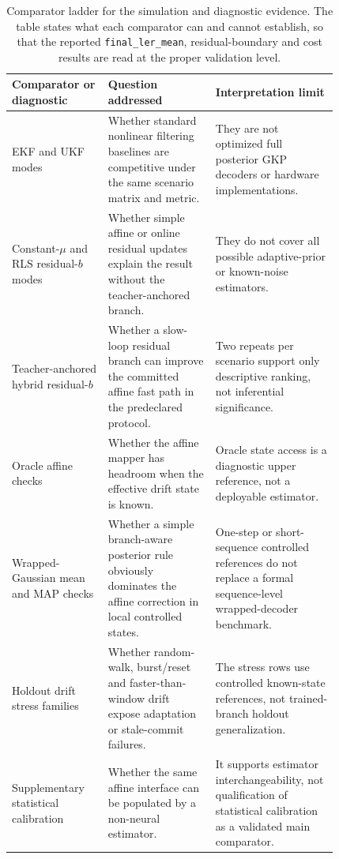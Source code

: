 \documentclass[11pt]{article}
\newcommand{\finalLER}{\texttt{final\_ler\_mean}}
\begin{document}
\begin{table}[htbp]
\centering
\small
\begin{tabular}{@{}>{\raggedright\arraybackslash}p{0.22\linewidth}>{\raggedright\arraybackslash}p{0.28\linewidth}>{\raggedright\arraybackslash}p{0.32\linewidth}@{}}
\toprule
Comparator or diagnostic & Question addressed & Interpretation limit \\
\midrule
EKF and UKF modes & Whether standard nonlinear filtering baselines are
competitive under the same scenario matrix and metric. & They are not
optimized full posterior GKP decoders or hardware implementations. \\
\addlinespace
Constant-\(\mu\) and RLS residual-\(b\) modes & Whether simple affine or
online residual updates explain the result without the teacher-anchored
branch. & They do not cover all possible adaptive-prior or known-noise
estimators. \\
\addlinespace
Teacher-anchored hybrid residual-\(b\) & Whether a slow-loop residual branch
can improve the committed affine fast path in the predeclared protocol. &
Two repeats per scenario support only descriptive ranking, not inferential
significance. \\
\addlinespace
Oracle affine checks & Whether the affine mapper has headroom when the
effective drift state is known. & Oracle state access is a diagnostic upper
reference, not a deployable estimator. \\
\addlinespace
Wrapped-Gaussian mean and MAP checks & Whether a simple branch-aware
posterior rule obviously dominates the affine correction in local controlled
states. & One-step or short-sequence controlled references do not replace a
formal sequence-level wrapped-decoder benchmark. \\
\addlinespace
Holdout drift stress families & Whether random-walk, burst/reset and
faster-than-window drift expose adaptation or stale-commit failures. & The
stress rows use controlled known-state references, not trained-branch holdout
generalization. \\
\addlinespace
Supplementary statistical calibration & Whether the same affine interface can
be populated by a non-neural estimator. & It supports estimator
interchangeability, not qualification of statistical calibration as a validated main
comparator. \\
\bottomrule
\end{tabular}
\caption{Comparator ladder for the simulation and diagnostic evidence.  The
table states what each comparator can and cannot establish, so that the
reported \finalLER{}, residual-boundary and cost results are read at the
proper validation level.}
\label{tab:comparator-ladder}
\end{table}
\end{document}
